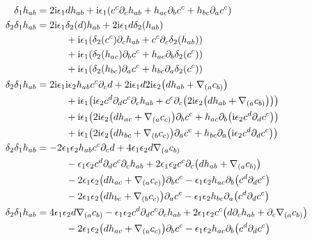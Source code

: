 \begin{align*}
    \delta_1 h_{ab}&=2\im\epsilon_1 d h_{ab}+\im\epsilon_1\qty(c^c\partial_ch_{ab}+h_{ac}\partial_bc^c+h_{bc}\partial_ac^c)\\
    \delta_2\delta_1 h_{ab}&=2\im\epsilon_1 \delta_2\qty(d) h_{ab}+2\im\epsilon_1 d \delta_2\qty(h_{ab})\\
    &\quad\quad\quad+\im\epsilon_1\qty(\delta_2\qty(c^c)\partial_ch_{ab}+c^c\partial_c\delta_2\qty(h_{ab}))\\
    &\quad\quad\quad+\im\epsilon_1\qty(\delta_2\qty(h_{ac})\partial_bc^c+h_{ac}\partial_b\delta_2\qty(c^c))\\
    &\quad\quad\quad+\im\epsilon_1\qty(\delta_2\qty(h_{bc})\partial_ac^c+h_{bc}\partial_a\delta_2\qty(c^c))\\
    \delta_2\delta_1 h_{ab}&=2\im\epsilon_1\im\epsilon_2 h_{ab}c^c\partial_c d+2\im\epsilon_1 d2\im\epsilon_2\qty(dh_{ab}+\nabla_{(a}c_{b)})\\
    &\quad\quad\quad+\im\epsilon_1\qty(\im\epsilon_2c^d\partial_dc^c\partial_ch_{ab}+c^c\partial_c\qty(2\im\epsilon_2\qty(dh_{ab}+\nabla_{(a}c_{b)})))\\
    &\quad\quad\quad+\im\epsilon_1\qty(2\im\epsilon_2\qty(dh_{ac}+\nabla_{(a}c_{c)})\partial_bc^c+h_{ac}\partial_b\qty(\im\epsilon_2c^d\partial_dc^c))\\
    &\quad\quad\quad+\im\epsilon_1\qty(2\im\epsilon_2\qty(dh_{bc}+\nabla_{(b}c_{c)})\partial_ac^c+h_{bc}\partial_a\qty(\im\epsilon_2c^d\partial_dc^c))\\
    \delta_2\delta_1 h_{ab}&=-2\epsilon_1\epsilon_2 h_{ab}c^c\partial_c d+4\epsilon_1 \epsilon_2d\nabla_{(a}c_{b)}\\
    &\quad\quad\quad-\epsilon_1\epsilon_2c^d\partial_dc^c\partial_ch_{ab}+2\epsilon_1\epsilon_2c^c\partial_c\qty(dh_{ab}+\nabla_{(a}c_{b)})\\
    &\quad\quad\quad-2\epsilon_1\epsilon_2\qty(dh_{ac}+\nabla_{(a}c_{c)})\partial_bc^c-\epsilon_1\epsilon_2h_{ac}\partial_b\qty(c^d\partial_dc^c)\\
    &\quad\quad\quad-2\epsilon_1\epsilon_2\qty(dh_{bc}+\nabla_{(b}c_{c)})\partial_ac^c-\epsilon_1\epsilon_2h_{bc}\partial_a\qty(c^d\partial_dc^c)\\
    \delta_2\delta_1 h_{ab}&=4\epsilon_1 \epsilon_2d\nabla_{(a}c_{b)}-\epsilon_1\epsilon_2c^d\partial_dc^c\partial_ch_{ab}+2\epsilon_1\epsilon_2c^c\qty(d\partial_ch_{ab}+\partial_c\nabla_{(a}c_{b)})\\
    &\quad\quad\quad-2\epsilon_1\epsilon_2\qty(dh_{ac}+\nabla_{(a}c_{c)})\partial_bc^c-\epsilon_1\epsilon_2h_{ac}\partial_b\qty(c^d\partial_dc^c)\\

\end{align*}
